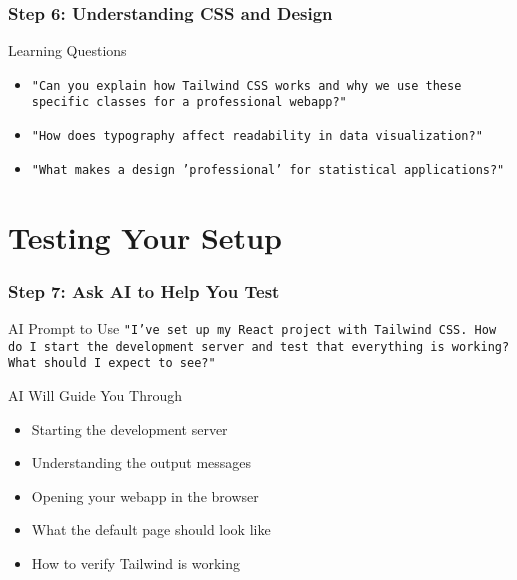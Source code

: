 \documentclass[aspectratio=169]{beamer}
\begin{document}
\begin{frame}
\frametitle{Step 6: Understanding CSS and Design}
\begin{alertblock}{Learning Questions}
\begin{itemize}
\item \texttt{"Can you explain how Tailwind CSS works and why we use these specific classes for a professional webapp?"}
\item \texttt{"How does typography affect readability in data visualization?"}
\item \texttt{"What makes a design 'professional' for statistical applications?"}
\end{itemize}
\end{alertblock}
\end{frame}

\section{Testing Your Setup}

\begin{frame}
\frametitle{Step 7: Ask AI to Help You Test}
\begin{alertblock}{AI Prompt to Use}
\texttt{"I've set up my React project with Tailwind CSS. How do I start the development server and test that everything is working? What should I expect to see?"}
\end{alertblock}

\begin{exampleblock}{AI Will Guide You Through}
\begin{itemize}
\item Starting the development server
\item Understanding the output messages
\item Opening your webapp in the browser
\item What the default page should look like
\item How to verify Tailwind is working
\end{itemize}
\end{exampleblock}
\end{frame}
\end{document}
